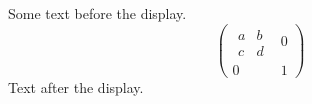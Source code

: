 \documentclass[12pt]{article}
\begin{document}
Some text before the display.
\[ \begin{pmatrix} \begin{matrix} a & b \\ c & d \end{matrix} & 0 \\ 0 & 1 \end{pmatrix} \]
Text after the display.
\end{document}
